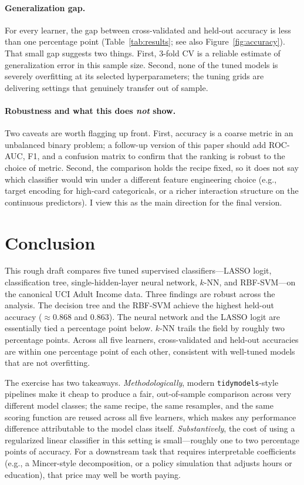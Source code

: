 \documentclass[12pt,english]{article}
\begin{document}
\paragraph{Generalization gap.}
For every learner, the gap between cross-validated and held-out accuracy
is less than one percentage point (Table~\ref{tab:results}; see also
Figure~\ref{fig:accuracy}). That small gap suggests two things. First,
3-fold CV is a reliable estimate of generalization error in this
sample size. Second, none of the tuned models is severely
overfitting at its selected hyperparameters; the tuning grids are
delivering settings that genuinely transfer out of sample.

\paragraph{Robustness and what this does \emph{not} show.}
Two caveats are worth flagging up front. First, accuracy is a coarse
metric in an unbalanced binary problem; a follow-up version of this paper
should add ROC-AUC, F1, and a confusion matrix to confirm that the
ranking is robust to the choice of metric. Second, the comparison holds
the recipe fixed, so it does not say which classifier would win under a
different feature engineering choice (e.g., target encoding for high-card
categoricals, or a richer interaction structure on the continuous
predictors). I view this as the main direction for the final version.

\section{Conclusion}\label{sec:conclusion}

This rough draft compares five tuned supervised classifiers---LASSO logit,
classification tree, single-hidden-layer neural network, $k$-NN, and
RBF-SVM---on the canonical UCI Adult Income data. Three findings are
robust across the analysis. The decision tree and the RBF-SVM achieve the
highest held-out accuracy ($\approx 0.868$ and $0.863$). The neural
network and the LASSO logit are essentially tied a percentage point
below. $k$-NN trails the field by roughly two percentage points. Across
all five learners, cross-validated and held-out accuracies are within
one percentage point of each other, consistent with well-tuned models
that are not overfitting.

The exercise has two takeaways. \emph{Methodologically}, modern
\texttt{tidymodels}-style pipelines make it cheap to produce a fair,
out-of-sample comparison across very different model classes; the same
recipe, the same resamples, and the same scoring function are reused
across all five learners, which makes any performance difference
attributable to the model class itself. \emph{Substantively}, the cost of
using a regularized linear classifier in this setting is small---roughly
one to two percentage points of accuracy. For a downstream task that
requires interpretable coefficients (e.g., a Mincer-style decomposition,
or a policy simulation that adjusts hours or education),
that price may well be worth paying.
\end{document}
